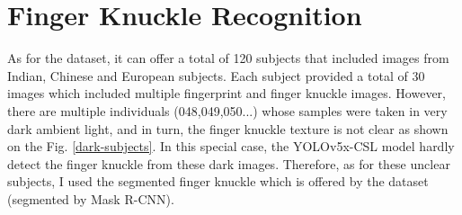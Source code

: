 \section{Finger Knuckle Recognition}

As for the dataset, it can offer a total of 120 subjects that included images from Indian, Chinese and European subjects. Each subject provided a total of 30 images which included multiple fingerprint and finger knuckle images.
However, there are multiple individuals (048,049,050...) whose samples were taken in very dark ambient light, and in turn, the finger knuckle texture is not clear as shown on the Fig. \ref{dark-subjects}. In this special case, the YOLOv5x-CSL model hardly detect the finger knuckle from these dark images. Therefore, as for these unclear subjects, I used the segmented finger knuckle which is offered by the dataset (segmented by Mask R-CNN).

